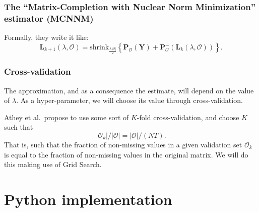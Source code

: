 \documentclass[11pt]{article}
\begin{document}
    \hypertarget{the-matrix-completion-with-nuclear-norm-minimization-estimator-mcnnm}{%
\subsubsection{The ``Matrix-Completion with Nuclear Norm Minimization''
estimator
(MCNNM)}\label{the-matrix-completion-with-nuclear-norm-minimization-estimator-mcnnm}}

    Formally, they write it like: \[
\mathbf{L}_{k+1}(\lambda, \mathcal{O})=\mathrm{shrink}_{\frac{\lambda |\mathcal{O}| }{2}}\left\{\mathbf{P}_{\mathcal{O}}(\mathbf{Y}) + \mathbf{P}_{\mathcal{O}}^{\bot}(\mathbf{L}_{k}(\lambda, \mathcal{O}))\right\}.
\]

    \hypertarget{cross-validation}{%
\subsubsection{Cross-validation}\label{cross-validation}}

    The approximation, and as a consequence the estimate, will depend on the
value of \(\lambda\). As a hyper-parameter, we will choose its value
through cross-validation.

Athey et al.~propose to use some sort of \(K\)-fold cross-validation,
and choose \(K\) such that
\[\left|\mathcal{O}_k\right|/\left|\mathcal{O}\right| = \left|\mathcal{O}\right|/(NT).\]
That is, such that the fraction of non-missing values in a given
validation set \(\mathcal{O}_k\) is equal to the fraction of non-missing
values in the original matrix. We will do this making use of Grid
Search.

    \hypertarget{python-implementation}{%
\section{Python implementation}\label{python-implementation}}
\end{document}
